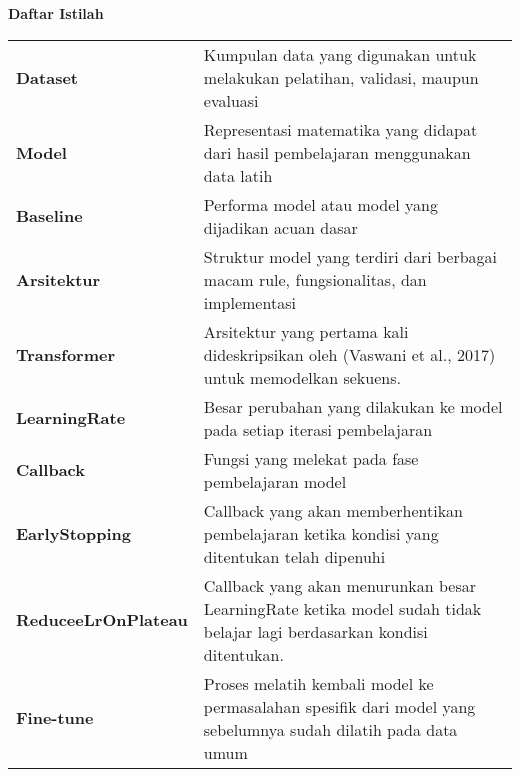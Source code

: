 \clearpage
\begin{center}
    \smallskip
    \large \bfseries{Daftar Istilah}

    \begin{table}[h]
        \begin{tabularx}{\textwidth}{|l|X|}
        \textbf{Dataset}     & Kumpulan data yang digunakan untuk melakukan pelatihan, validasi, maupun evaluasi      \\
        \textbf{Model}       & Representasi matematika yang didapat dari hasil pembelajaran menggunakan data latih               \\
        \textbf{Baseline}    & Performa model atau model yang dijadikan acuan dasar                                              \\
        \textbf{Arsitektur}  & Struktur model yang terdiri dari berbagai macam rule, fungsionalitas, dan implementasi            \\
        \textbf{Transformer} & Arsitektur yang pertama kali dideskripsikan oleh (Vaswani et al., 2017) untuk memodelkan sekuens. \\
        \textbf{LearningRate} & Besar perubahan yang dilakukan ke model pada setiap iterasi pembelajaran \\ 
        \textbf{Callback} & Fungsi yang melekat pada fase pembelajaran model \\
        \textbf{EarlyStopping} & Callback yang akan memberhentikan pembelajaran ketika kondisi yang ditentukan telah dipenuhi \\
        \textbf{ReduceeLrOnPlateau} & Callback yang akan menurunkan besar LearningRate ketika model sudah tidak belajar lagi berdasarkan kondisi ditentukan. \\
        \textbf{Fine-tune} & Proses melatih kembali model ke permasalahan spesifik dari model yang sebelumnya sudah dilatih pada data umum \\
        \end{tabularx}
    \end{table}
\end{center}
\clearpage
